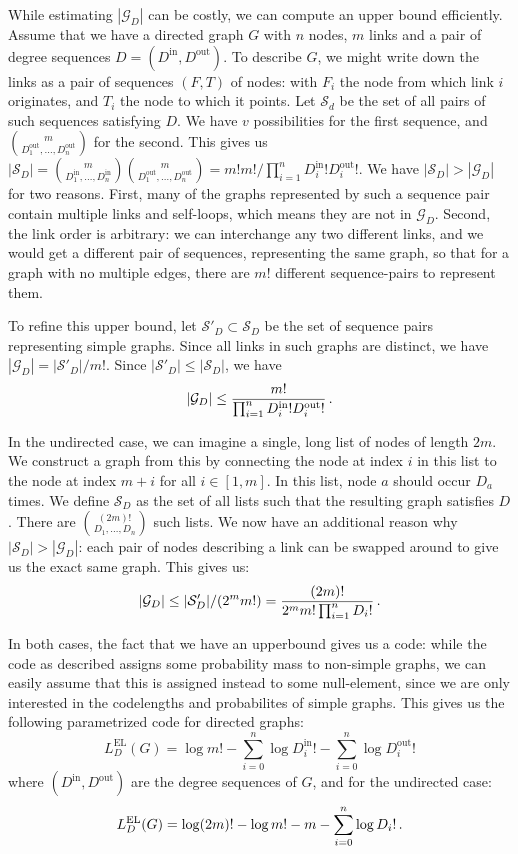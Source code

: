 \documentclass[twoside,11pt]{article}
\newcommand{\p}{\mbox{\,.}}
\newcommand{\cG}{{\mathcal G}}
\newcommand{\cS}{{\mathcal S}}
\begin{document}
While estimating $|\cG_D|$ can be costly, we can compute an upper bound efficiently. Assume that we have a directed graph $G$ with $n$ nodes, $m$ links and a pair of degree sequences $D = (D^\text{in}, D^\text{out})$. To describe $G$, we might write down the links as a pair of sequences $(F, T)$ of nodes: with  $F_i$ the node from which link $i$ originates, and $T_i$ the node to which it points. Let $\cS_d$ be the set of all pairs of such sequences satisfying $D$. We have $ v$ possibilities for the first sequence, and $m \choose D_1^\text{out}, \ldots, D_n^\text{out}$ for the second. This gives us $|\cS_D| = {m \choose D_1^\text{in}, \ldots, D_n^\text{in}}{m \choose D_1^\text{out}, \ldots, D_n^\text{out}} = m!m! / \prod_{i=1}^n D^\text{in}_i ! D^\text{out}_i !$. We have $|\cS_D| > |\cG_D|$ for two reasons. First, many of the graphs represented by such a sequence pair contain multiple links and self-loops, which means they are not in $\cG_D$. Second, the link order is arbitrary: we can interchange any two different links, and we would get a different pair of sequences, representing the same graph, so that for a graph with no multiple edges, there are $m!$ different sequence-pairs to represent them. 

To refine this upper bound, let $\cS'_D \subset \cS_D$ be the set of sequence pairs representing simple graphs. Since all links in such graphs are distinct, we have $|\cG_D| = |\cS'_D|/m!$. Since $|\cS'_D| \leq |\cS_D|$, we have \footnotemark
\[
|\cG_D| \leq \frac{m!}{\prod_{i=1}^n D^\text{in}_i ! D^\text{out}_i !} \p
\]


In the undirected case, we can imagine a single, long list of nodes of length $2m$. We construct a graph from this by connecting the node at index $i$ in this list to the node at index $m+i$ for all $i \in [1, m]$. In this list, node $a$ should occur $D_a$ times. We define $\cS_D$ as the set of all lists such that the resulting graph satisfies $D$. There are $(2m)! \choose D_1, \ldots, D_n$ such lists.
We now have an additional reason why $|\cS_D| > |\cG_D|$: each pair of nodes describing a link can be swapped around to give us the exact same graph. This gives us:
\[
|\cG_D| \leq |\cS'_D| / (2^m m!) = \frac{(2m)!}{2^m m! \prod_{i=1}^n D_i!} \p
\]

In both cases, the fact that we have an upperbound gives us a code: while the code as described assigns some probability mass to non-simple graphs, we can easily assume that this is assigned instead to some null-element, since we are only interested in the codelengths and probabilites of simple graphs. This gives us the following parametrized code for directed graphs:
\[
L^\text{EL}_D(G) = \log m! - \sum_{i=0}^n \log D_i^\text{in}! - \sum_{i=0}^n \log D_i^\text{out}!   
\]
where $(D^\text{in}, D^\text{out})$ are the degree sequences of $G$, and for the undirected case:
\[
L^\text{EL}_D(G) = \log (2m)! - \log m! - m - \sum_{i=0}^n \log D_i! \p   
\]
\end{document}
